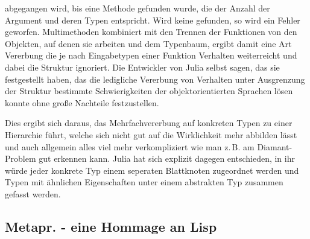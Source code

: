 \documentclass[proseminar,german,utf8]{zihpub}
\newcommand{\zB}[0]{{z.\,B. }}
\begin{document}
abgegangen wird, bis eine Methode gefunden wurde, die der Anzahl der Argument und deren Typen entspricht. Wird keine gefunden, so wird ein Fehler geworfen. Multimethoden kombiniert mit den Trennen der Funktionen von den Objekten, auf denen sie arbeiten und dem Typenbaum, ergibt damit eine Art Vererbung die je nach Eingabetypen einer Funktion Verhalten weiterreicht und dabei die Struktur ignoriert. Die Entwickler von Julia selbst sagen, das sie festgestellt haben, das die ledigliche Vererbung von Verhalten unter Ausgrenzung der Struktur bestimmte Schwierigkeiten der objektorientierten Sprachen lösen konnte ohne große Nachteile festzustellen. 

Dies ergibt sich daraus, das Mehrfachvererbung auf konkreten Typen zu einer Hierarchie führt, welche sich nicht gut auf die Wirklichkeit mehr abbilden lässt und auch allgemein alles viel mehr verkompliziert wie man \zB am Diamant-Problem gut erkennen kann. Julia hat sich explizit dagegen entschieden, in ihr würde jeder konkrete Typ einem seperaten Blattknoten zugeordnet werden und Typen mit ähnlichen Eigenschaften unter einem abstrakten Typ zusammen gefasst werden.

\subsection{Metapr. - eine Hommage an Lisp}
\end{document}
